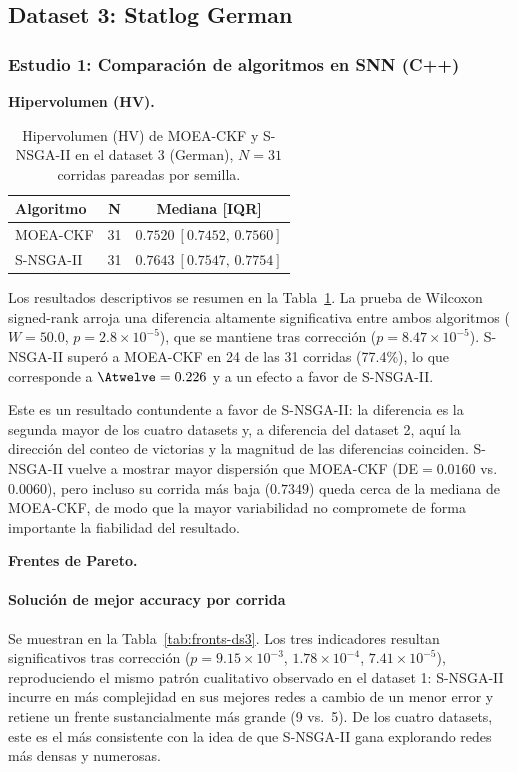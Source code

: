 \subsection{Dataset 3: Statlog German}
\label{sec:ds3}

\subsubsection{Estudio 1: Comparación de algoritmos en SNN (C++)}
\label{sec:ds3-estudio1}

\textbf{Hipervolumen (HV).}\label{sec:ds3-hv}

\begin{table}[htbp]
\centering
\small
\caption{Hipervolumen (HV) de MOEA-CKF y S-NSGA-II en el dataset 3 (German), $N=31$ corridas pareadas por semilla.}
\label{tab:hv-ds3}
\begin{tabular}{@{}lcc@{}}
\toprule
\textbf{Algoritmo} & \textbf{N} & \textbf{Mediana [IQR]} \\
\midrule
MOEA-CKF & 31 & $0.7520\ [0.7452,\,0.7560]$ \\
S-NSGA-II & 31 & $0.7643\ [0.7547,\,0.7754]$ \\
\bottomrule
\end{tabular}
\end{table}

Los resultados descriptivos se resumen en la Tabla~\ref{tab:hv-ds3}. La prueba de Wilcoxon signed-rank arroja una diferencia altamente significativa entre ambos algoritmos ($W=50.0$, $p=2.8\times10^{-5}$), que se mantiene tras corrección ($p=8.47\times10^{-5}$). S-NSGA-II superó a MOEA-CKF en 24 de las 31 corridas (77.4\%), lo que corresponde a $\Atwelve=0.226$ y a un efecto a favor de S-NSGA-II.

Este es un resultado contundente a favor de S-NSGA-II: la diferencia es la segunda mayor de los cuatro datasets y, a diferencia del dataset 2, aquí la dirección del conteo de victorias y la magnitud de las diferencias coinciden. S-NSGA-II vuelve a mostrar mayor dispersión que MOEA-CKF (DE$=0.0160$ vs.\ $0.0060$), pero incluso su corrida más baja ($0.7349$) queda cerca de la mediana de MOEA-CKF, de modo que la mayor variabilidad no compromete de forma importante la fiabilidad del resultado.

\textbf{Frentes de Pareto.}\label{sec:ds3-fronts}

\paragraph{Solución de mejor accuracy por corrida} Se muestran en la Tabla~\ref{tab:fronts-ds3}. Los tres indicadores resultan significativos tras corrección ($p=9.15\times10^{-3}$, $1.78\times10^{-4}$, $7.41\times10^{-5}$), reproduciendo el mismo patrón cualitativo observado en el dataset 1: S-NSGA-II incurre en más complejidad en sus mejores redes a cambio de un menor error y retiene un frente sustancialmente más grande (9 vs.\ 5). De los cuatro datasets, este es el más consistente con la idea de que S-NSGA-II gana explorando redes más densas y numerosas.

